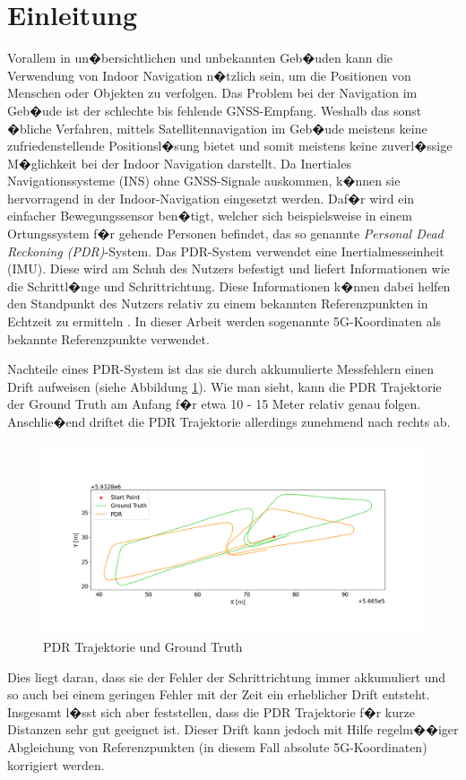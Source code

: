 \section{Einleitung}
Vorallem in un�bersichtlichen und unbekannten Geb�uden kann die Verwendung von Indoor Navigation n�tzlich sein, um die Positionen von Menschen oder Objekten zu verfolgen. Das Problem bei der Navigation im Geb�ude ist der schlechte bis fehlende GNSS-Empfang. Weshalb das sonst �bliche Verfahren, mittels Satellitennavigation im Geb�ude meistens keine zufriedenstellende Positionsl�sung bietet und somit meistens keine zuverl�ssige M�glichkeit bei der Indoor Navigation darstellt. Da Inertiales Navigationssysteme (INS) ohne GNSS-Signale auskommen, k�nnen sie hervorragend in der Indoor-Navigation eingesetzt werden. Daf�r wird ein einfacher Bewegungssensor ben�tigt, welcher sich beispielsweise in einem Ortungssystem f�r gehende Personen befindet, das so genannte \textit{Personal Dead Reckoning (PDR)}-System. Das PDR-System verwendet eine Inertialmesseinheit (IMU). Diese wird am Schuh des Nutzers befestigt und liefert Informationen wie die Schrittl�nge und Schrittrichtung. Diese Informationen k�nnen dabei helfen den Standpunkt des Nutzers relativ zu einem bekannten Referenzpunkten in Echtzeit zu ermitteln \parencite{borenstein2007}. In dieser Arbeit werden sogenannte 5G-Koordinaten als bekannte Referenzpunkte verwendet.

Nachteile eines PDR-System ist das sie durch akkumulierte Messfehlern einen Drift aufweisen (siehe Abbildung \ref{fig:pdr}). Wie man sieht, kann die PDR Trajektorie der Ground Truth am Anfang f�r etwa 10 - 15 Meter relativ genau folgen. Anschlie�end driftet die PDR Trajektorie allerdings zunehmend nach rechts ab.
\begin{figure}[h!]
	\centering
	\includegraphics[width=0.8\linewidth]{source/images/pdr_drift}
	\caption{PDR Trajektorie und Ground Truth}
	\label{fig:pdr}
\end{figure}
Dies liegt daran, dass sie der Fehler der Schrittrichtung immer akkumuliert und so auch bei einem geringen Fehler mit der Zeit ein erheblicher Drift entsteht. Insgesamt l�sst sich aber feststellen, dass die PDR Trajektorie f�r kurze Distanzen sehr gut geeignet ist. Dieser Drift kann jedoch mit Hilfe regelm��iger Abgleichung von Referenzpunkten (in diesem Fall absolute 5G-Koordinaten) korrigiert werden. 

